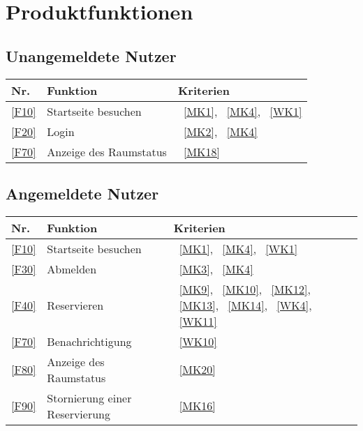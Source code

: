 

\chapter{Produktfunktionen}
\label{chap:product_functions}



\section{Unangemeldete Nutzer}\label{sec:unangemeldete-benutzer-funktionen}
\begin{table}[htbp]
    \centering
    \begin{tabularx}{\textwidth}{ l|X|>{\raggedright\arraybackslash}X }
        \textbf{Nr.} & \textbf{Funktion} & \textbf{Kriterien} \\ \hline\hline
        \ref{F10} & Startseite besuchen &~\ref{MK1}, ~\ref{MK4}, ~\ref{WK1} \\
        \ref{F20} & Login &~\ref{MK2}, ~\ref{MK4} \\
        \ref{F70} & Anzeige des Raumstatus &~\ref{MK18} \\
    \end{tabularx}
    \label{tab:non_loggedin_functions}
\end{table}

\section{Angemeldete Nutzer}\label{sec:angemeldete-benutzer-funktionen}
\begin{table}[htbp]
    \centering
    \begin{tabularx}{\textwidth}{ l|X|>{\raggedright\arraybackslash}X }
        \textbf{Nr.} & \textbf{Funktion} & \textbf{Kriterien} \\ \hline\hline
        \ref{F10} & Startseite besuchen &~\ref{MK1}, ~\ref{MK4}, ~\ref{WK1} \\
        \ref{F30} & Abmelden &~\ref{MK3}, ~\ref{MK4} \\
        \ref{F40} & Reservieren &~\ref{MK9}, ~\ref{MK10}, ~\ref{MK12}, ~\ref{MK13}, ~\ref{MK14}, ~\ref{WK4}, ~\ref{WK11} \\
        \ref{F70} & Benachrichtigung &~\ref{WK10} \\
        \ref{F80} & Anzeige des Raumstatus &~\ref{MK20} \\
        \ref{F90} & Stornierung einer Reservierung &~\ref{MK16} \\
    \end{tabularx}
    \label{tab:loggedin_functions}
\end{table}
\newpage
